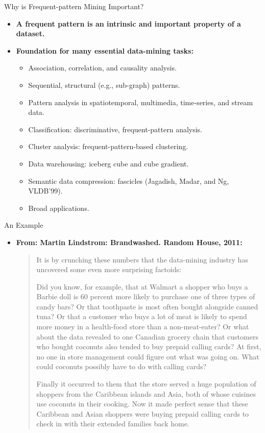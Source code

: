 \begin{frame}{Why is Frequent-pattern Mining Important?}
	\begin{itemize}
		\item \textbf{A frequent pattern is an intrinsic and important property
			      of a dataset.}
		\item \textbf{Foundation for many essential data-mining tasks:}
		      \begin{itemize}
			      \item Association, correlation, and causality analysis.
			      \item Sequential, structural (e.g., sub-graph) patterns.
			      \item Pattern analysis in spatiotemporal, multimedia, time-series,
			            and stream data.
			      \item Classification: discriminative, frequent-pattern analysis.
			      \item Cluster analysis: frequent-pattern-based clustering.
			      \item Data warehousing: iceberg cube and cube gradient.
			      \item Semantic data compression: fascicles (Jagadish, Madar, and
			            Ng, VLDB'99).
			      \item Broad applications.
		      \end{itemize}
	\end{itemize}
\end{frame}

\begin{frame}{An Example}
	\begin{itemize}
		\item \textbf{From: Martin Lindstrom: Brandwashed. Random House, 2011:}
		      \begin{quote}
			      It is by crunching these numbers that the data-mining industry has
			      uncovered some even more surprising factoids:

			      Did you know, for example, that at Walmart a shopper who buys a
			      Barbie doll is 60 percent more likely to purchase one of three
			      types of candy bars? Or that toothpaste is most often bought
			      alongside canned tuna? Or that a customer who buys a lot of meat is
			      likely to spend more money in a health-food store than a
			      non-meat-eater? Or what about the data revealed to one Canadian
			      grocery chain that customers who bought coconuts also tended to buy
			      prepaid calling cards? At first, no one in store management could
			      figure out what was going on. What could coconuts possibly have to
			      do with calling cards?

			      Finally it occurred to them that the store served a huge population
			      of shoppers from the Caribbean islands and Asia, both of whose
			      cuisines use coconuts in their cooking. Now it made perfect sense
			      that these Caribbean and Asian shoppers were buying prepaid calling
			      cards to check in with their extended families back home.
		      \end{quote}
	\end{itemize}
\end{frame}

